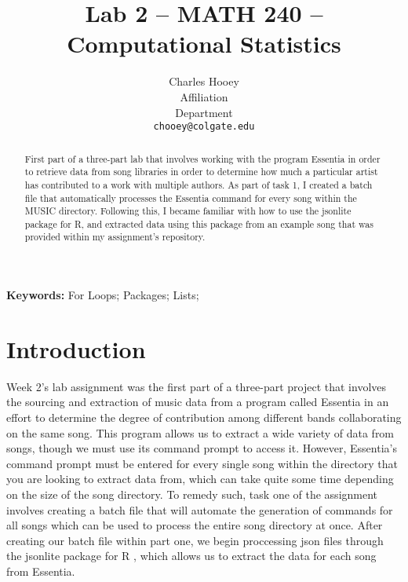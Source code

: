 \documentclass{article}\usepackage[]{graphicx}\usepackage[]{xcolor}
\begin{document}
\vspace{-1in}
\title{Lab 2 -- MATH 240 -- Computational Statistics}

\author{
  Charles Hooey \\
  Affiliation  \\
  Department  \\
  {\tt chooey@colgate.edu}
}

\date{}

\maketitle

\begin{multicols}{2}
\begin{abstract}
First part of a three-part lab that involves working with the program Essentia in order to retrieve data from song libraries in order to determine how much a particular artist has contributed to a work with multiple authors. As part of task 1, I created a batch file that automatically processes the Essentia command for every song within the MUSIC directory. Following this, I became familiar with how to use the jsonlite package for R, and extracted data using this package from an example song that was provided within my assignment's repository.
\end{abstract}

\noindent \textbf{Keywords:} For Loops; Packages; Lists;

\section{Introduction}
Week 2's lab assignment was the first part of a three-part project that involves the sourcing and extraction of music data from a program called Essentia in an effort to determine the degree of contribution among different bands collaborating on the same song.  This program allows us to extract a wide variety of data from songs, though we must use its command prompt to access it. However, Essentia's command prompt must be entered for every single song within the directory that you are looking to extract data from, which can take quite some time depending on the size of the song directory. To remedy such, task one of the assignment involves creating a batch file that will automate the generation of commands for all songs which can be used to process the entire song directory at once. After creating our batch file within part one, we begin proccessing json files through the jsonlite package for R \citep{jsonlite}, which allows us to extract the data for each song from Essentia.




\end{multicols}
\end{document}

